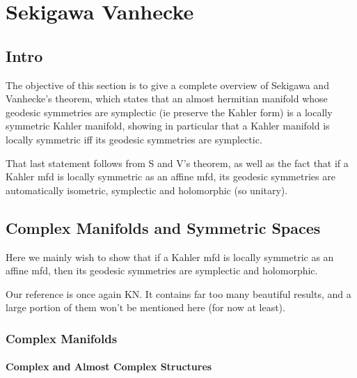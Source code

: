 \documentclass{report}
\theoremstyle{definition}
\begin{document}
\part{Sekigawa Vanhecke}

\chapter{Intro}

The objective of this section is to give a complete overview of Sekigawa and Vanhecke's theorem, which states that an almost hermitian manifold whose geodesic symmetries are symplectic (ie preserve the Kahler form) is a locally symmetric Kahler manifold, showing in particular that a Kahler manifold is locally symmetric iff its geodesic symmetries are symplectic.

That last statement follows from S and V's theorem, as well as the fact that if a Kahler mfd is locally symmetric as an affine mfd, its geodesic symmetries are automatically isometric, symplectic and holomorphic (so unitary).

\chapter{Complex Manifolds and Symmetric Spaces}

Here we mainly wish to show that if a Kahler mfd is locally symmetric as an affine mfd, then its geodesic symmetries are symplectic and holomorphic.

Our reference is once again KN. It contains far too many beautiful results, and a large portion of them won't be mentioned here (for now at least).

\section{Complex Manifolds}

\subsection{Complex and Almost Complex Structures}
\end{document}
